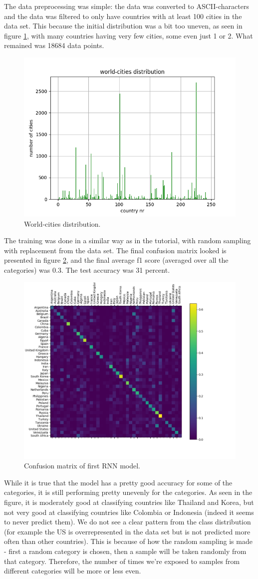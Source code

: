 \documentclass[runningheads]{llncs}
\begin{document}
The data preprocessing was simple: the data was converted to ASCII-characters and the data was filtered to only have countries with at least 100 cities in the data set. This because the initial distribution was a bit too uneven, as seen in figure \ref{fig:world_cities}, with many countries having very few cities, some even just 1 or 2. What remained was 18684 data points.

\begin{figure}[h!]
	\centering
	\includegraphics[width=.5\textwidth]{plots/dist.png}	
	\caption{ World-cities distribution.}
	\label{fig:world_cities}
\end{figure}

The training was done in a similar way as in the tutorial, with random sampling with replacement from the data set. The final confusion matrix looked is presented in figure \ref{fig:conf_init},
and the final average f1 score (averaged over all the categories) was 0.3. The test accuracy was 31 percent.

\begin{figure}[h!]
	\centering
        \includegraphics[width=.5\textwidth]{plots/confusion_matrix_initial.png}
	\caption{ Confusion matrix of first RNN model.}
	\label{fig:conf_init}
\end{figure}


While it is true that the model has a pretty good accuracy for some of the categories, it is still performing pretty unevenly for the categories. As seen in the figure, it is moderately good at classifying countries like Thailand and Korea, but not very good at classifying countries like Colombia or Indonesia (indeed it seems to never predict them). We do not see a clear pattern from the class distribution (for example the US is overrepresented in the data set but is not predicted more often than other countries). This is because of how the random sampling is made - first a random category is chosen, then a sample will be taken randomly from that category. Therefore, the number of times we're exposed to samples from different categories will be more or less even.
\end{document}
